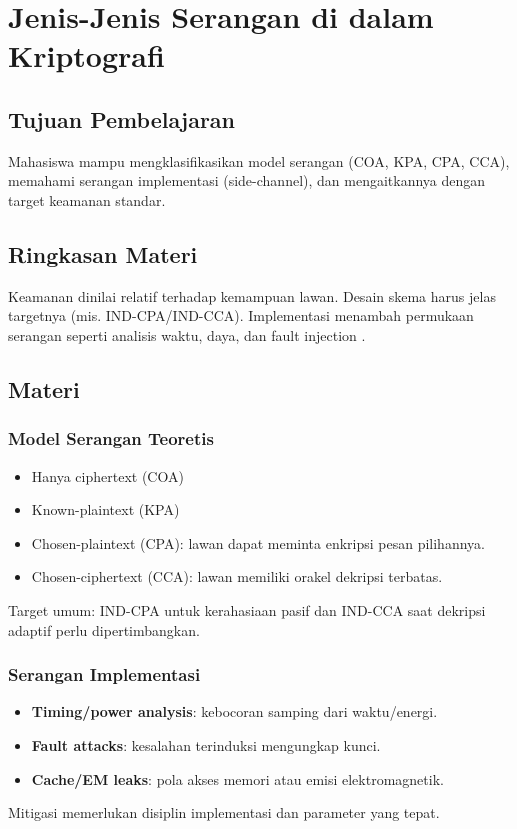 \documentclass[../main.tex]{subfiles}
\begin{document}
\chapter{Jenis-Jenis Serangan di dalam Kriptografi}
\section{Tujuan Pembelajaran}
Mahasiswa mampu mengklasifikasikan model serangan (COA, KPA, CPA, CCA), memahami serangan implementasi (side-channel), dan mengaitkannya dengan target keamanan standar.

\section{Ringkasan Materi}
Keamanan dinilai relatif terhadap kemampuan lawan. Desain skema harus jelas targetnya (mis. IND-CPA/IND-CCA). Implementasi menambah permukaan serangan seperti analisis waktu, daya, dan fault injection \citep{bonehshoup,bellare_rogaway_notes}.

\section{Materi}
\subsection{Model Serangan Teoretis}
\begin{itemize}
  \item Hanya ciphertext (COA)
  \item Known-plaintext (KPA)
  \item Chosen-plaintext (CPA): lawan dapat meminta enkripsi pesan pilihannya.
  \item Chosen-ciphertext (CCA): lawan memiliki orakel dekripsi terbatas.
\end{itemize}
Target umum: IND-CPA untuk kerahasiaan pasif dan IND-CCA saat dekripsi adaptif perlu dipertimbangkan.

\subsection{Serangan Implementasi}
\begin{itemize}
  \item \textbf{Timing/power analysis}: kebocoran samping dari waktu/energi.
  \item \textbf{Fault attacks}: kesalahan terinduksi mengungkap kunci.
  \item \textbf{Cache/EM leaks}: pola akses memori atau emisi elektromagnetik.
\end{itemize}
Mitigasi memerlukan disiplin implementasi dan parameter yang tepat.
\end{document}
